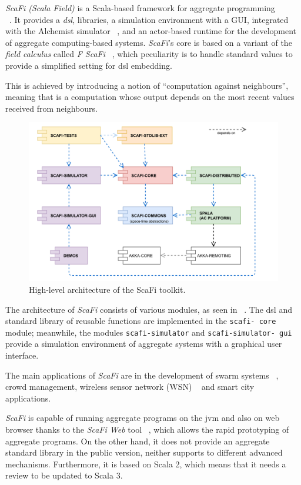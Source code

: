 \emph{ScaFi (Scala Field)} is a Scala-based framework for aggregate programming\\ ~\cite{CASADEI2022101248}.
It provides a \emph{\ac{dsl}}, libraries, a simulation environment with a GUI, integrated with the
Alchemist simulator ~\cite{10.1007/978-3-030-78198-9_10}, and an actor-based runtime for the development of aggregate computing-based systems.
\emph{ScaFi}'s core is based on a variant of the \emph{field calculus} called \emph{F ScaFi} ~\cite{10.1007/978-3-030-61470-6_21},
which peculiarity is to handle standard values to provide a simplified setting for \ac{dsl} embedding.

This is achieved by introducing a notion of ``computation against neighbours'', meaning that is a computation whose
output depends on the most recent values received from neighbours.

\begin{figure}
    \centering
    \includegraphics[width=.5\linewidth]{figures/scafi_structure}
    \caption{High-level architecture of the ScaFi toolkit.}
    \label{fig:scafi-structure}
\end{figure}

The architecture of \emph{ScaFi} consists of various modules, as seen in ~.
The \ac{dsl} and standard library of reusable functions are implemented in the \texttt{scafi-
core} module; meanwhile, the modules \texttt{scafi-simulator} and \texttt{scafi-simulator-
gui} provide a simulation
environment of aggregate systems with a graphical user interface.

The main applications of \emph{ScaFi} are in the development of swarm systems ~\cite{10336236}, crowd management, wireless sensor network (WSN) ~\cite{9935036}
and smart city applications.

\emph{ScaFi} is capable of running aggregate programs on the \ac{jvm} and also on web browser thanks
to the \emph{ScaFi Web} tool ~\cite{10.1007/978-3-030-78142-2_18}, which allows the rapid prototyping of aggregate programs.
On the other hand, it does not provide an aggregate standard library in the public version, neither supports to
different advanced mechanisms.
Furthermore, it is based on Scala 2, which means that it needs a review to be updated to Scala 3.

